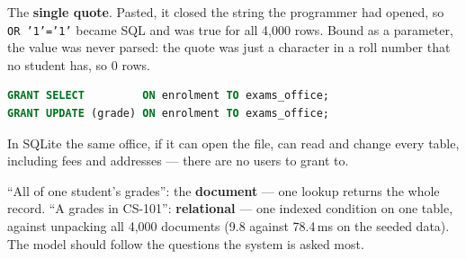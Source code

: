 \begin{ans}
  \item The \textbf{single quote}. Pasted, it closed the string the programmer
        had opened, so \texttt{OR '1'='1'} became SQL and was true for all
        4{,}000 rows. Bound as a parameter, the value was never parsed: the
        quote was just a character in a roll number that no student has, so 0
        rows.
  \item
\begin{lstlisting}[language=sql]
GRANT SELECT         ON enrolment TO exams_office;
GRANT UPDATE (grade) ON enrolment TO exams_office;
\end{lstlisting}
        In SQLite
        the same office, if it can open the file, can read and change every
        table, including fees and addresses --- there are no users to grant to.
  \item ``All of one student's grades'': the \textbf{document} --- one lookup
        returns the whole record. ``A grades in CS-101'': \textbf{relational}
        --- one indexed condition on one table, against unpacking all 4{,}000
        documents (9.8 against 78.4\,ms on the seeded data). The model should
        follow the questions the system is asked most.
\end{ans}
